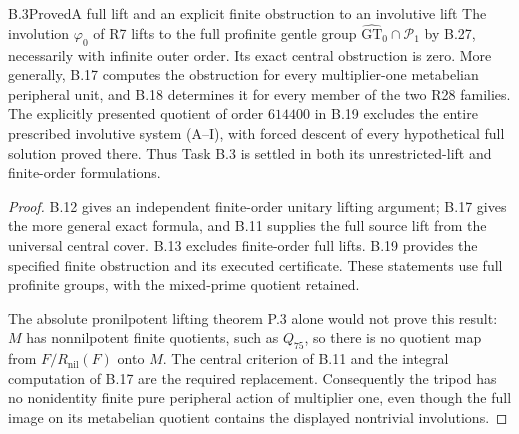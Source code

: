 \begin{statement}{B.3}{Proved}{A full lift and an explicit finite obstruction to an involutive lift}
The involution $\varphi_0$ of R7 lifts to the full profinite
gentle group $\widehat{\mathrm{GT}}_0\cap\mathcal P_1$
by B.27, necessarily with infinite outer
order. Its exact central obstruction is zero. More generally,
B.17 computes the obstruction for every multiplier-one
metabelian peripheral unit, and B.18 determines it for every
member of the two R28 families. The explicitly presented
quotient of order $614400$ in B.19 excludes the entire prescribed
involutive system (A--I), with forced descent of every hypothetical
full solution proved there. Thus Task B.3 is settled in both its
unrestricted-lift and finite-order formulations.
\end{statement}
\begin{proof}
B.12 gives an independent finite-order unitary lifting argument;
B.17 gives the more general exact formula, and B.11 supplies the
full source lift from the universal central cover. B.13 excludes
finite-order full lifts. B.19 provides the specified finite
obstruction and its executed certificate. These statements use
full profinite groups, with the mixed-prime quotient retained.

The absolute pronilpotent lifting theorem P.3 alone would not
prove this result: $M$ has nonnilpotent finite quotients, such as
$Q_{75}$, so there is no quotient map from
$F/R_{\mathrm{nil}}(F)$ onto $M$. The central criterion of B.11
and the integral computation of B.17 are the required replacement.
Consequently the tripod has no nonidentity finite pure peripheral
action of multiplier one, even though the full image on its
metabelian quotient contains the displayed nontrivial involutions.
\end{proof}

